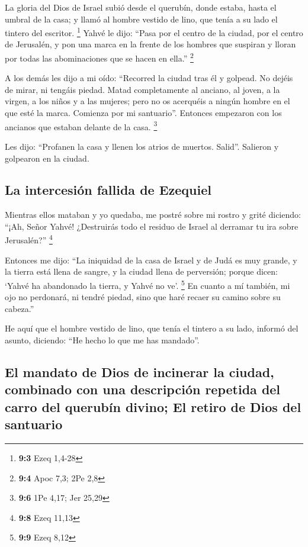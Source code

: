  La gloria del Dios de Israel subió desde el querubín,
donde estaba, hasta el umbral de la casa; y llamó al hombre vestido de
lino, que tenía a su lado el tintero del escritor. \footnote{\textbf{9:3}
  Ezeq 1,4-28}  Yahvé le dijo: ``Pasa por el centro de la
ciudad, por el centro de Jerusalén, y pon una marca en la frente de los
hombres que suspiran y lloran por todas las abominaciones que se hacen
en ella.'' \footnote{\textbf{9:4} Apoc 7,3; 2Pe 2,8}

 A los demás les dijo a mi oído: ``Recorred la ciudad tras
él y golpead. No dejéis de mirar, ni tengáis piedad. 
Matad completamente al anciano, al joven, a la virgen, a los niños y a
las mujeres; pero no os acerquéis a ningún hombre en el que esté la
marca. Comienza por mi santuario''. Entonces empezaron con los ancianos
que estaban delante de la casa. \footnote{\textbf{9:6} 1Pe 4,17; Jer
  25,29}

 Les dijo: ``Profanen la casa y llenen los atrios de
muertos. Salid''. Salieron y golpearon en la ciudad.

\hypertarget{la-intercesiuxf3n-fallida-de-ezequiel}{%
\subsection{La intercesión fallida de
Ezequiel}\label{la-intercesiuxf3n-fallida-de-ezequiel}}

 Mientras ellos mataban y yo quedaba, me postré sobre mi
rostro y grité diciendo: ``¡Ah, Señor Yahvé! ¿Destruirás todo el residuo
de Israel al derramar tu ira sobre Jerusalén?'' \footnote{\textbf{9:8}
  Ezeq 11,13}

 Entonces me dijo: ``La iniquidad de la casa de Israel y
de Judá es muy grande, y la tierra está llena de sangre, y la ciudad
llena de perversión; porque dicen: `Yahvé ha abandonado la tierra, y
Yahvé no ve'. \footnote{\textbf{9:9} Ezeq 8,12}  En
cuanto a mí también, mi ojo no perdonará, ni tendré piedad, sino que
haré recaer su camino sobre su cabeza.''

 He aquí que el hombre vestido de lino, que tenía el
tintero a su lado, informó del asunto, diciendo: ``He hecho lo que me
has mandado''.

\hypertarget{el-mandato-de-dios-de-incinerar-la-ciudad-combinado-con-una-descripciuxf3n-repetida-del-carro-del-querubuxedn-divino-el-retiro-de-dios-del-santuario}{%
\subsection{El mandato de Dios de incinerar la ciudad, combinado con una
descripción repetida del carro del querubín divino; El retiro de Dios
del
santuario}\label{el-mandato-de-dios-de-incinerar-la-ciudad-combinado-con-una-descripciuxf3n-repetida-del-carro-del-querubuxedn-divino-el-retiro-de-dios-del-santuario}}

